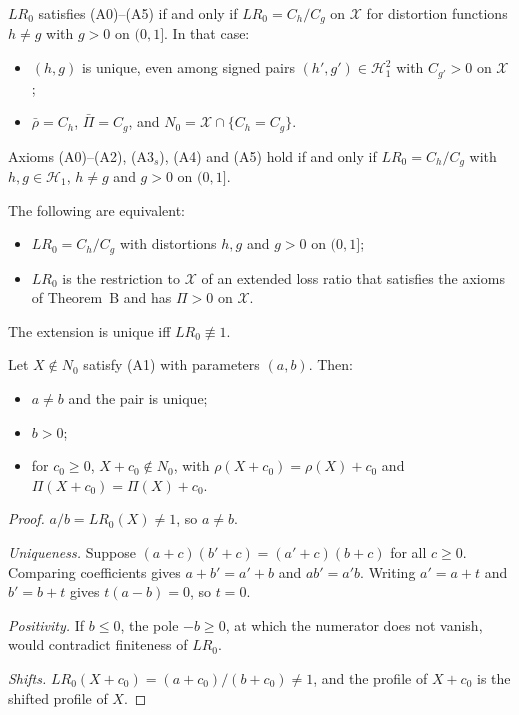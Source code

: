 \begin{theorem}
$LR_0$ satisfies (A0)--(A5) if and only if $LR_0=C_h/C_g$ on $\mathcal X$ for distortion functions $h\neq g$ with $g>0$ on $(0,1]$. In that case:
\begin{itemize}
\item $(h,g)$ is unique, even among signed pairs $(h',g')\in\mathcal H_1^2$ with $C_{g'}>0$ on $\mathcal X$;
\item $\bar\rho=C_h$, $\bar\Pi=C_g$, and $N_0=\mathcal X\cap\{C_h=C_g\}$.
\end{itemize}
\end{theorem}

\begin{theorem}
Axioms (A0)--(A2), (A3$_s$), (A4) and (A5) hold if and only if $LR_0=C_h/C_g$ with $h,g\in\mathcal H_1$, $h\neq g$ and $g>0$ on $(0,1]$.
\end{theorem}

\begin{proposition}[Bridge]
The following are equivalent:
\begin{itemize}
\item $LR_0=C_h/C_g$ with distortions $h,g$ and $g>0$ on $(0,1]$;
\item $LR_0$ is the restriction to $\mathcal X$ of an extended loss ratio that satisfies the axioms of Theorem~B and has $\Pi>0$ on $\mathcal X$.
\end{itemize}
The extension is unique iff $LR_0\not\equiv1$.
\end{proposition}

\begin{lemma}
Let $X\notin N_0$ satisfy (A1) with parameters $(a,b)$. Then:
\begin{itemize}
\item $a\neq b$ and the pair is unique;
\item $b>0$;
\item for $c_0\ge0$, $X+c_0\notin N_0$, with $\rho(X+c_0)=\rho(X)+c_0$ and $\Pi(X+c_0)=\Pi(X)+c_0$.
\end{itemize}
\end{lemma}

\begin{proof}
$a/b=LR_0(X)\neq1$, so $a\neq b$.

\emph{Uniqueness.} Suppose $(a+c)(b'+c)=(a'+c)(b+c)$ for all $c\ge0$. Comparing coefficients gives $a+b'=a'+b$ and $ab'=a'b$. Writing $a'=a+t$ and $b'=b+t$ gives $t(a-b)=0$, so $t=0$.

\emph{Positivity.} If $b\le0$, the pole $-b\ge0$, at which the numerator does not vanish, would contradict finiteness of $LR_0$.

\emph{Shifts.} $LR_0(X+c_0)=(a+c_0)/(b+c_0)\neq1$, and the profile of $X+c_0$ is the shifted profile of $X$.
\end{proof}

